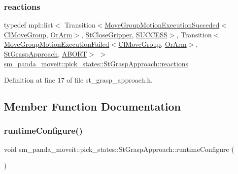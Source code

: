 \subsubsection{\texorpdfstring{reactions}{reactions}}
{\footnotesize\ttfamily typedef mpl\+::list$<$ Transition$<$\hyperlink{structmoveit__z__client_1_1MoveGroupMotionExecutionSucceded}{Move\+Group\+Motion\+Execution\+Succeded}$<$\hyperlink{classmoveit__z__client_1_1ClMoveGroup}{Cl\+Move\+Group}, \hyperlink{classsm__panda__moveit_1_1OrArm}{Or\+Arm}$>$, \hyperlink{structsm__panda__moveit_1_1pick__states_1_1StCloseGripper}{St\+Close\+Gripper}, \hyperlink{classSUCCESS}{S\+U\+C\+C\+E\+SS}$>$, Transition$<$\hyperlink{structmoveit__z__client_1_1MoveGroupMotionExecutionFailed}{Move\+Group\+Motion\+Execution\+Failed}$<$\hyperlink{classmoveit__z__client_1_1ClMoveGroup}{Cl\+Move\+Group}, \hyperlink{classsm__panda__moveit_1_1OrArm}{Or\+Arm}$>$, \hyperlink{structsm__panda__moveit_1_1pick__states_1_1StGraspApproach}{St\+Grasp\+Approach}, \hyperlink{classABORT}{A\+B\+O\+RT}$>$ $>$ \hyperlink{structsm__panda__moveit_1_1pick__states_1_1StGraspApproach_ae6bca0382acc2309654ca8a12e6f05f8}{sm\+\_\+panda\+\_\+moveit\+::pick\+\_\+states\+::\+St\+Grasp\+Approach\+::reactions}}



Definition at line 17 of file st\+\_\+grasp\+\_\+approach.\+h.



\subsection{Member Function Documentation}
\mbox{\label{structsm__panda__moveit_1_1pick__states_1_1StGraspApproach_a7acd876063ef2f90614f4f31ce39a95d}} 
\subsubsection{\texorpdfstring{runtime\+Configure()}{runtimeConfigure()}}
{\footnotesize\ttfamily void sm\+\_\+panda\+\_\+moveit\+::pick\+\_\+states\+::\+St\+Grasp\+Approach\+::runtime\+Configure (\begin{DoxyParamCaption}{ }\end{DoxyParamCaption})\hspace{0.3cm}{\ttfamily [inline]}}



